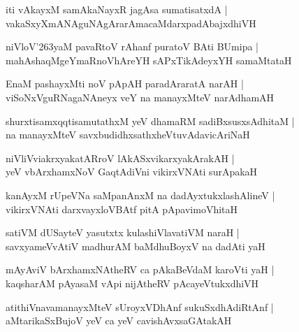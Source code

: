 \documentclass[twoside,12pt,openright]{book}
\def\S{\char'263}
\newcounter{shloka}[chapter]
\begin{document}
\begin{shloka}%
iti vAkayxM samAkaNayxR jagAsa sumatisatxdA |\\
vakaSxyXmANAguNAgArarAmacaMdarxpadAbajxdhiVH 
\end{shloka}

\begin{shloka}%
niVloV\S yaM pavaRtoV rAhanf puratoV BAti BUmipa |\\
mahAshaqMgeYmaRnoVhAreYH sAPxTikAdeyxYH samaMtataH
\end{shloka}

\begin{shloka}%
EnaM pashayxMti noV pApAH paradAraratA narAH |\\
viSoNxVguRNagaNAneyx veY na manayxMteV narAdhamAH 
\end{shloka}

\begin{shloka}%
shurxtisamxqqtisamutathxM yeV dhamaRM sadiBxsusxsAdhitaM |\\
na manayxMteV savxbudidhxsathxheVtuvAdavicAriNaH
\end{shloka}

\begin{shloka}%
niVliVviakrxyakatARroV lAkASxvikarxyakArakAH |\\
yeV vbArxhamxNoV GaqtAdiVni vikirxVNAti surApakaH  
\end{shloka}

\begin{shloka}%
kanAyxM rUpeVNa saMpanAnxM na dadAyxtukxlashAlineV |\\
vikirxVNAti darxvayxloVBAtf pitA pApavimoVhitaH 
\end{shloka}

\begin{shloka}%
satiVM dUSayteV yasutxtx kulashiVlavatiVM  naraH |\\
savxyameVvAtiV madhurAM baMdhuBoyxV na dadAti yaH 
\end{shloka}

\begin{shloka}%
mAyAviV bArxhamxNAtheRV ca pAkaBeVdaM karoVti yaH |\\
kaqsharAM pAyasaM vApi nijAtheRV pAcayeVtukxdhiVH 
\end{shloka}

\begin{shloka}%
atithiVnavamanayxMteV sUroyxVDhAnf sukuSxdhAdiRtAnf |\\
aMtarikaSxBujoV yeV ca yeV cavishAvxsaGAtakAH  
\end{shloka}
\end{document}
